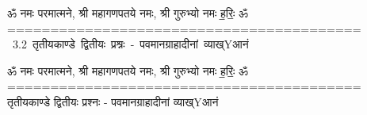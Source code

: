 \documentclass[17pt]{extarticle}
\begin{document}
\begin{titlepage}
    \begin{center}
 
\begin{sanskrit}
    { \Large
    ॐ नमः परमात्मने, श्री महागणपतये नमः, श्री गुरुभ्यो नमः
ह॒रिः॒ ॐ
========================================= 
    }
    \\
    \vspace{2.5cm}
    \mbox{ \Huge
    3.2     तृतीयकाण्डे द्वितीयः प्रश्नः - पवमानग्राहादीनां व्याख्Yआनं   }
\end{sanskrit}
\end{center}

\end{titlepage}
\tableofcontents

ॐ नमः परमात्मने, श्री महागणपतये नमः, श्री गुरुभ्यो नमः
ह॒रिः॒ ॐ
=========================================      तृतीयकाण्डे द्वितीयः प्रश्नः - पवमानग्राहादीनां व्याख्Yआनं \newline

\end{document}
